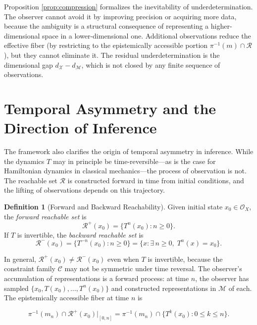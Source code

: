 \documentclass[12pt, a4paper, oneside]{article}
\theoremstyle{plain}
\theoremstyle{definition}
\newtheorem{definition}[theorem]{Definition}
\theoremstyle{remark}
\newcommand{\X}{\mathcal{X}}
\newcommand{\C}{\mathcal{C}}
\newcommand{\M}{\mathcal{M}}
\newcommand{\Obs}{\mathcal{O}}
\newcommand{\R}{\mathcal{R}}
\newcommand{\T}{T}
\newcommand{\proj}{\pi}
\begin{document}
Proposition \ref{prop:compression} formalizes the inevitability of underdetermination. The observer cannot avoid it by improving precision or acquiring more data, because the ambiguity is a structural consequence of representing a higher-dimensional space in a lower-dimensional one. Additional observations reduce the effective fiber (by restricting to the epistemically accessible portion $\proj^{-1}(m) \cap \R$), but they cannot eliminate it. The residual underdetermination is the dimensional gap $d_\X - d_\M$, which is not closed by any finite sequence of observations.

\section{Temporal Asymmetry and the Direction of Inference}

The framework also clarifies the origin of temporal asymmetry in inference. While the dynamics $\T$ may in principle be time-reversible---as is the case for Hamiltonian dynamics in classical mechanics---the process of observation is not. The reachable set $\R$ is constructed forward in time from initial conditions, and the lifting of observations depends on this trajectory.

\begin{definition}[Forward and Backward Reachability]
Given initial state $x_0 \in \Obs_X$, the \emph{forward reachable set} is
\begin{equation}
\R^+(x_0) = \{\T^n(x_0) : n \geq 0\}.
\end{equation}
If $\T$ is invertible, the \emph{backward reachable set} is
\begin{equation}
\R^-(x_0) = \{\T^{-n}(x_0) : n \geq 0\} = \{x : \exists\, n \geq 0,\; \T^n(x) = x_0\}.
\end{equation}
\end{definition}

In general, $\R^+(x_0) \neq \R^-(x_0)$ even when $\T$ is invertible, because the constraint family $\C$ may not be symmetric under time reversal. The observer's accumulation of representations is a forward process: at time $n$, the observer has sampled $\{x_0, \T(x_0), \ldots, \T^n(x_0)\}$ and constructed representations in $\M$ of each. The epistemically accessible fiber at time $n$ is

\begin{equation}
\proj^{-1}(m_n) \cap \R^+(x_0)|_{[0,n]} = \proj^{-1}(m_n) \cap \{\T^k(x_0) : 0 \leq k \leq n\}.
\end{equation}
\end{document}
